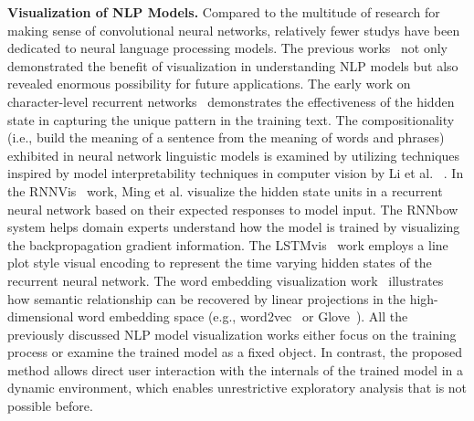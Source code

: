 \textbf{Visualization of NLP Models.}
Compared to the multitude of research for making sense of convolutional neural networks, relatively fewer studys have been dedicated to neural language processing models.
%
The previous works~\cite{KarpathyJohnson2015, LiChenHovy2015, StrobeltGehrmannPfister2018, LiuBremerJayaraman2018} not only demonstrated the benefit of visualization in understanding NLP models but also revealed enormous possibility for future applications.
The early work on character-level recurrent networks~\cite{KarpathyJohnson2015} demonstrates the effectiveness of the hidden state in capturing the unique pattern in the training text. The compositionality (i.e., build the meaning of a sentence from the meaning of words and phrases) exhibited in neural network linguistic models is examined by utilizing techniques inspired by model interpretability techniques in computer vision by Li et al. ~\cite{LiChenHovy2015}.
In the RNNVis~\cite{MingCaoZhang2017} work, Ming et al. visualize the hidden state units in a recurrent neural network based on their expected responses to model input.
The RNNbow~\cite{CashmanPattersonMosca2017} system helps domain experts understand how the model is trained by visualizing the backpropagation gradient information.
The LSTMvis~\cite{StrobeltGehrmannPfister2018} work employs a line plot style visual encoding to represent the time varying hidden states of the recurrent neural network. The word embedding visualization work~\cite{LiuBremerJayaraman2018} illustrates how semantic relationship can be recovered by linear projections in the high-dimensional word embedding space (e.g., word2vec~\cite{MikolovSutskeverChen2013} or Glove~\cite{PenningtonSocherManning2014}).
%
All the previously discussed NLP model visualization works either focus on the training process or examine the trained model as a fixed object. In contrast, the proposed method allows direct user interaction with the internals of the trained model in a dynamic environment, which enables unrestrictive exploratory analysis that is not possible before.

